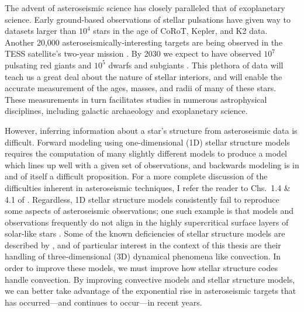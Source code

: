 The advent of asteroseismic science has closely paralleled that of exoplanetary science.
Early ground-based observations of stellar pulsations \cite[e.g.,][]{kjeldsen&frandsen1991, bouchy&carrier2001, bedding&all2001} have given way to datasets larger than $10^4$ stars \cite[e.g.,][]{yu&all2018, santos&all2019b} in the age of CoRoT, Kepler, and K2 data.
Another 20,000 asteroseismically-interesting targets are being observed in the TESS satellite's two-year mission \citep{schofield&all2019}.
By 2030 we expect to have observed $10^7$ pulsating red giants and $10^5$ dwarfs and subgiants \citep{huber&all2019}.
This plethora of data will teach us a great deal about the nature of stellar interiors, and will enable the accurate measurement of the ages, masses, and radii of many of these stars.
These measurements in turn facilitates studies in numerous astrophysical disciplines, including galactic archaeology and exoplanetary science.

However, inferring information about a star's structure from asteroseismic data is difficult.
Forward modeling using one-dimensional (1D) stellar structure models requires the computation of many slightly different models to produce a model which lines up well with a given set of observations, and backwards modeling is in and of itself a difficult proposition.
For a more complete discussion of the difficulties inherent in asteroseismic techniques, I refer the reader to Chs.~1.4 \& 4.1 of \citet{bellingerT2018}.
Regardless, 1D stellar structure models consistently fail to reproduce some aspects of asteroseismic observations; one such example is that models and observations frequently do not align in the highly supercritical surface layers of solar-like stars \citep[as discussed in][]{jorgensen&weiss2019}.
Some of the known deficiencies of stellar structure models are described by \cite{buldgen2019}, and of particular interest in the context of this thesis are their handling of three-dimensional (3D) dynamical phenomena like convection.
In order to improve these models, we must improve how stellar structure codes handle convection.
By improving convective models and stellar structure models, we can better take advantage of the exponential rise in asteroseismic targets that has occurred---and continues to occur---in recent years.



